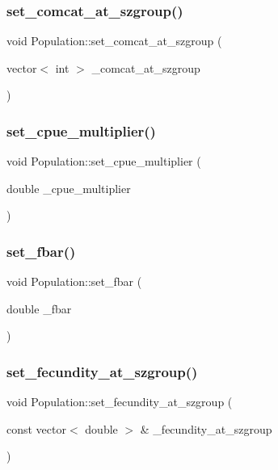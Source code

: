 \subsubsection{\texorpdfstring{set\_comcat\_at\_szgroup()}{set\_comcat\_at\_szgroup()}}
{\footnotesize\ttfamily void Population\+::set\+\_\+comcat\+\_\+at\+\_\+szgroup (\begin{DoxyParamCaption}\item[{vector$<$ int $>$}]{\+\_\+comcat\+\_\+at\+\_\+szgroup }\end{DoxyParamCaption})}

\mbox{\label{class_population_a55aef29cf0f834568f2ca8841d925362}} 
\subsubsection{\texorpdfstring{set\_cpue\_multiplier()}{set\_cpue\_multiplier()}}
{\footnotesize\ttfamily void Population\+::set\+\_\+cpue\+\_\+multiplier (\begin{DoxyParamCaption}\item[{double}]{\+\_\+cpue\+\_\+multiplier }\end{DoxyParamCaption})}

\mbox{\label{class_population_aadd6481dcab8e0a35e73b03b0e5e82c1}} 
\subsubsection{\texorpdfstring{set\_fbar()}{set\_fbar()}}
{\footnotesize\ttfamily void Population\+::set\+\_\+fbar (\begin{DoxyParamCaption}\item[{double}]{\+\_\+fbar }\end{DoxyParamCaption})}

\mbox{\label{class_population_a5ac5539c89af87a8388f126a319741a9}} 
\subsubsection{\texorpdfstring{set\_fecundity\_at\_szgroup()}{set\_fecundity\_at\_szgroup()}}
{\footnotesize\ttfamily void Population\+::set\+\_\+fecundity\+\_\+at\+\_\+szgroup (\begin{DoxyParamCaption}\item[{const vector$<$ double $>$ \&}]{\+\_\+fecundity\+\_\+at\+\_\+szgroup }\end{DoxyParamCaption})}

